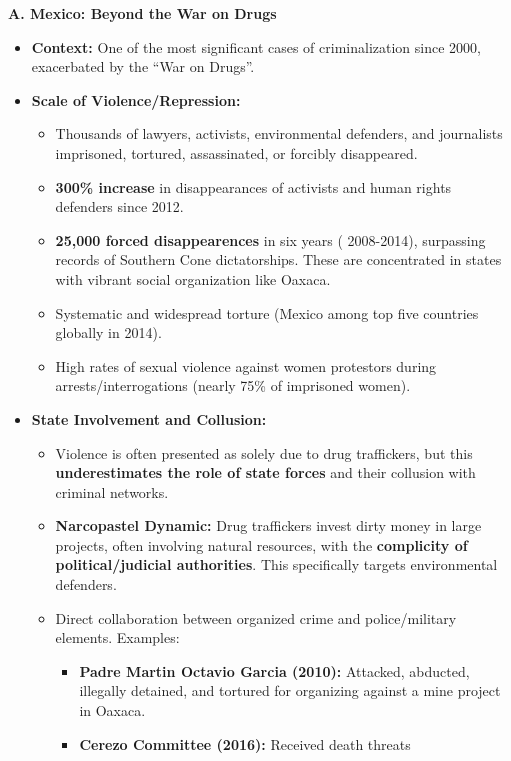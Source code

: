 \documentclass{article}
\begin{document}
\noindent \textbf{ A. Mexico: Beyond the War on Drugs}
\begin{itemize}
    \item \textbf{Context:} One of the most significant cases of
    criminalization since 2000, exacerbated by the ``War on Drugs''.
    \item \textbf{Scale of Violence/Repression:}
    \begin{itemize}
        \item Thousands of lawyers, activists, environmental
        defenders, and journalists imprisoned, tortured,
        assassinated, or forcibly disappeared.
        \item \textbf{300\% increase} in disappearances of activists
        and human rights defenders since 2012.
        \item \textbf{25,000 forced disappearences} in six years (
        2008-2014), surpassing records of Southern Cone
        dictatorships. These are concentrated in states with vibrant
        social organization like Oaxaca.
        \item Systematic and widespread torture (Mexico among top
        five countries globally in 2014).
        \item High rates of sexual violence against women protestors
        during arrests/interrogations (nearly 75\% of imprisoned women).
    \end{itemize}
    \item \textbf{State Involvement and Collusion:}
    \begin{itemize}
        \item Violence is often presented as solely due to drug traffickers,
        but this \textbf{underestimates the role of state forces} and their
        collusion with criminal networks.
        \item \textbf{Narcopastel Dynamic:} Drug traffickers invest dirty
        money in large projects, often involving natural resources, with the \textbf{complicity of political/judicial authorities}. This specifically targets environmental defenders.
        \item Direct collaboration between organized crime and
        police/military elements. Examples:
        \begin{itemize}
            \item \textbf{Padre Martin Octavio Garcia (2010):} Attacked,
            abducted, illegally detained, and tortured for organizing against
            a mine project in Oaxaca.
            \item \textbf{Cerezo Committee (2016):} Received death threats

\end{itemize}
\end{itemize}
\end{itemize}
\end{document}
